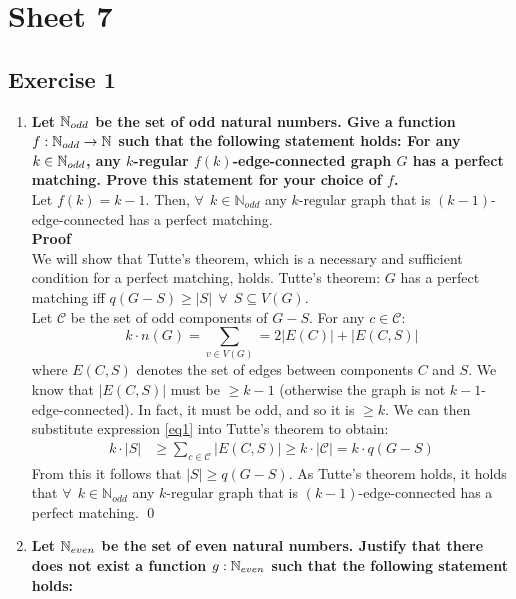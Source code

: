 \section*{Sheet 7}
\subsection*{Exercise 1}
\begin{enumerate}[label=\textbf{(\alph*)}]
\boldmath
    \item\textbf{Let $\mathbb{N}_{odd}$ be the set of odd natural numbers. Give a function $f: \mathbb{N}_{odd} \rightarrow \mathbb{N}$ such that the following statement holds: For any $k \in \mathbb{N}_{odd}$, any $k$-regular $f(k)$-edge-connected graph $G$ has a perfect matching. Prove this statement for your choice of $f$.\\
    \linebreak}
    \unboldmath
    Let $f(k)=k-1$. Then, $\forall \:\: k \in \mathbb{N}_{odd}$ any $k$-regular graph that is $(k-1)$-edge-connected has a perfect matching. \\
    \linebreak 
    \textbf{Proof} \\
    We will show that Tutte's theorem, which is a necessary and sufficient condition for a perfect matching, holds. Tutte's theorem: $G$ has a perfect matching iff $q(G-S) \geq |S| \:\: \forall \:\: S \subseteq V(G)$. \\
    \linebreak 
    Let $\mathcal{C}$ be the set of odd components of $G-S$. For any $c \in \mathcal{C}$:
    \begin{equation}
        k\cdot n(G) = \sum_{v \in V(G)} = 2|E(C)| + |E(C,S)|
        \label{eq1}
    \end{equation}
    where $E(C, S)$ denotes the set of edges between components $C$ and $S$.
    We know that $|E(C, S)|$ must be $\geq k-1$ (otherwise the graph is not $k-1$-edge-connected). In fact, it must be odd, and so it is $\geq k$.
    We can then substitute expression \ref{eq1} into Tutte's theorem to obtain:
    \begin{align}
        k\cdot |S| &\geq \sum_{c \in \mathcal{C}} |E(C, S)| \geq k \cdot|\mathcal{C}| = k\cdot q(G-S)
    \end{align}
    From this it follows that $|S| \geq q(G-S)$. As Tutte's theorem holds, it holds that $\forall \:\: k \in \mathbb{N}_{odd}$ any $k$-regular graph that is $(k-1)$-edge-connected has a perfect matching. \qed
    \boldmath
    \item\textbf{Let $\mathbb{N}_{even}$ be the set of even natural numbers. Justify that there does not exist a function $g: \mathbb{N}_{even}$ such that the following statement holds:
}
\end{enumerate}
